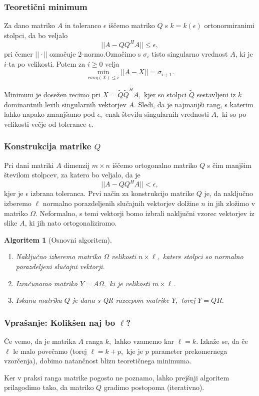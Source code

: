 \documentclass{beamer}
\newtheorem{algoritem}{Algoritem}
\begin{document}
\begin{frame}
\frametitle{Teoretični minimum}

Za dano matriko $A$ in toleranco $\epsilon$ iščemo matriko $Q$ s $k = k(\epsilon)$ ortonormiranimi stolpci, da bo veljalo $$||A - QQ^HA|| \leq \epsilon,$$ pri čemer $|| \cdot ||$ označuje $2$-normo.Označimo s $\sigma_i$ tisto singularno vrednost $A$, ki je $i$-ta po velikosti. Potem za $i \geq 0$ velja $$\min_{rang(X) \leq i} ||A - X || = \sigma_{i+1}.$$

Minimum je dosežen recimo pri $X = \tilde{Q}\tilde{Q}^HA,$ kjer so stolpci $\tilde{Q}$ sestavljeni iz $k$ dominantnih levih singularnih vektorjev $A$. Sledi, da je najmanjši rang, s katerim lahko napako zmanjšamo pod $\epsilon,$ enak številu singularnih vrednosti $A,$ ki so po velikosti večje od tolerance $\epsilon.$
\end{frame}
\begin{frame}
\frametitle{Konstrukcija matrike $Q$}

Pri dani matriki $A$ dimenzij $m \times n$ iščemo ortogonalno matriko $Q$ s čim manjšim številom stolpcev, za katero bo veljalo, da je $$||A - QQ^HA|| < \epsilon,$$ kjer je $\epsilon$ izbrana toleranca. Prvi način za konstrukcijo matrike $Q$ je, da naključno izberemo $\ell$ normalno porazdeljenih slučajnih vektorjev dolžine $n$ in jih zložimo v matriko $\Omega.$ Neformalno, s temi vektorji bomo izbrali naključni vzorec vektorjev iz slike $A$, ki jih nato ortogonaliziramo. %

\begin{algoritem}[Osnovni algoritem]
\begin{enumerate}
\item Naključno izberemo matriko $\Omega$ velikosti $n \times \ell,$ katere stolpci so normalno porazdeljeni slučajni vektorji.
\item Izračunamo matriko $Y = A \Omega,$ ki je velikosti $m \times \ell.$ 
\item Iskana matrika $Q$ je dana s QR-razcepom matrike $Y,$ torej $Y = QR.$
\end{enumerate}
\end{algoritem}

\end{frame}

\begin{frame}
\frametitle{Vprašanje: Kolikšen naj bo $\ell$?}

Če vemo, da je matrika $A$ ranga $k,$ lahko vzamemo kar $\ell = k.$ Izkaže se, da če $\ell$ le malo povečamo (torej $\ell = k + p,$ kje je $p$ parameter prekomernega vzorčenja), dobimo natančnost blizu teoretičnega minimuma. 

Ker v praksi ranga matrike pogosto ne poznamo, lahko prejšnji algoritem prilagodimo tako, da matriko $Q$ gradimo postopoma (iterativno).

\end{frame}
\end{document}
